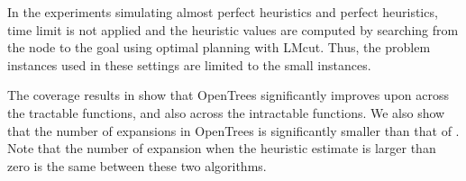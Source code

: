 In the experiments simulating almost perfect heuristics and perfect
heuristics, time limit is not applied and the heuristic values are computed by searching
from the node to the goal using optimal planning with LMcut. Thus, the
problem instances used in these settings are limited to the small instances.

The coverage results in  show that OpenTrees significantly improves upon \astar across the tractable functions, and also across the intractable functions. We also show that the number of expansions in OpenTrees is significantly smaller than that of \astar. Note that the number of expansion when the heuristic estimate is larger than zero is the same between these two algorithms.

